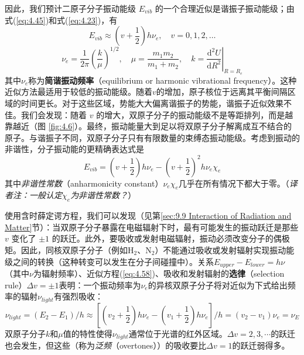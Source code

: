     因此，我们预计二原子分子振动能级 $E_{vib}$ 的一个合理近似是谐振子振动能级；由式(\ref{eq:4.45})和式(\ref{eq:4.23})，有
    \begin{equation}
        \boxed{
            E_{vib} \approx \left(v+\frac{1}{2}\right)h\nu_e, \quad v = 0, 1, 2, \ldots
        }
        \label{eq:4.58}
    \end{equation}
    \begin{equation}
        \boxed{
            \nu_e = \frac{1}{2\pi}\left(\frac{k}{\mu}\right)^{1/2}, \quad \mu = \frac{m_1m_2}{m_1+m_2}, \quad k = \left.\frac{\mathrm{d}^2U}{\mathrm{d}R^2}\right|_{R=R_e}
        }
        \label{eq:4.59}
    \end{equation}
    其中$\nu_e$称为\textbf{简谐振动频率}（equilibrium or harmonic vibrational frequency）。这种近似方法最适用于较低的振动能级。随着$v$的增加，原子核位于远离其平衡间隔区域的时间更长。对于这些区域，势能大大偏离谐振子的势能，谐振子近似效果不佳。我们会发现：随着 $v$ 的增大，双原子分子的振动能级不是等距排列，而是越靠越近（图 \ref{fig:4.6}）。最终，振动能量大到足以将双原子分子解离成互不结合的原子。与谐振子不同，双原子分子只有有限数量的束缚态振动能级。考虑到振动的非谐性，分子振动能的更精确表达式是
    \begin{equation}
        E_{vib} = \left(v+\frac{1}{2}\right)h\nu_e - \left(v+\frac{1}{2}\right)^2h\nu_e \chi_e
        \label{eq:4.60}
    \end{equation}
    其中\textit{非谐性常数}（anharmonicity constant）$\nu_e\chi_e$几乎在所有情况下都大于零。（\textit{译者注：一般认定$\chi_e$为非谐性常数？}）

    使用含时薛定谔方程，我们可以发现（见第\ref{sec:9.9 Interaction of Radiation and Matter}节）：当双原子分子暴露在电磁辐射下时，最有可能发生的振动跃迁是那些 $v$ 变化了 $\pm 1$ 的跃迁。此外，要吸收或发射电磁辐射，振动必须改变分子的偶极矩。因此，同核双原子分子（例如$\mathrm{H}_2$、$\mathrm{N}_2$）不能通过吸收或发射辐射实现振动能级之间的转换（这种转变可以发生在分子间碰撞中）。关系$E_{upper}-E_{lower} = h\nu$（其中$\nu$为辐射频率）、近似方程(\ref{eq:4.58})、吸收和发射辐射的\textbf{选律}（selection rule）$\Delta v = \pm 1$表明：一个振动频率为$\nu_e$的异核双原子分子将对近似为下式给出频率的辐射$\nu_{light}$有强烈吸收：
    \begin{equation}
        \nu_{light} = \left(E_2-E_1\right)/h \approx \left[\left(v_2+\frac{1}{2}\right)h\nu_e-\left(v_1+\frac{1}{2}\right)h\nu_e\right]/h = \left(v_2-v_1\right)\nu_e = \nu_E
        \label{eq:4.61}
    \end{equation}
    双原子分子$k$和$\mu$值的特性使得$\nu_{light}$通常位于光谱的红外区域。$\Delta v = 2,3,\cdots$的跃迁也会发生，但这些（称为\textit{泛频}（overtones））的吸收要比$\Delta v = 1$的跃迁弱得多。

